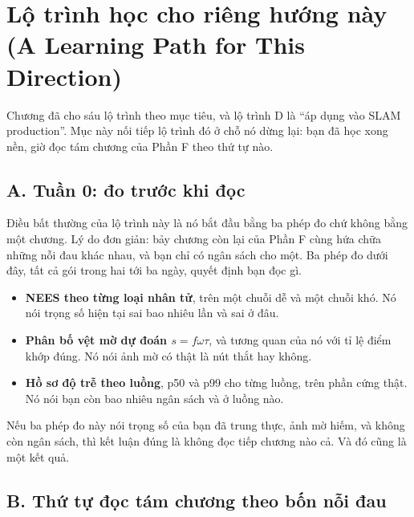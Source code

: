 \documentclass[../../deep_learning.tex]{subfiles}
\begin{document}
\section{Lộ trình học cho riêng hướng này (A Learning Path for This Direction)}

Chương  đã cho sáu lộ trình theo mục tiêu, và lộ trình D là ``áp dụng vào SLAM production''. Mục này nối tiếp lộ trình đó ở chỗ nó dừng lại: bạn đã học xong nền, giờ đọc tám chương của Phần F theo thứ tự nào.

\subsection{A. Tuần 0: đo trước khi đọc}

Điều bất thường của lộ trình này là nó bắt đầu bằng ba phép đo chứ không bằng một chương. Lý do đơn giản: bảy chương còn lại của Phần F cùng hứa chữa những nỗi đau khác nhau, và bạn chỉ có ngân sách cho một. Ba phép đo dưới đây, tất cả gói trong hai tới ba ngày, quyết định bạn đọc gì.

\begin{itemize}
\item \textbf{NEES theo từng loại nhân tử}, trên một chuỗi dễ và một chuỗi khó. Nó nói trọng số hiện tại sai bao nhiêu lần và sai ở đâu.
\item \textbf{Phân bố vệt mờ dự đoán \(s = f\omega\tau\)}, và tương quan của nó với tỉ lệ điểm khớp đúng. Nó nói ảnh mờ có thật là nút thắt hay không.
\item \textbf{Hồ sơ độ trễ theo luồng}, p50 và p99 cho từng luồng, trên phần cứng thật. Nó nói bạn còn bao nhiêu ngân sách và ở luồng nào.
\end{itemize}

Nếu ba phép đo này nói trọng số của bạn đã trung thực, ảnh mờ hiếm, và không còn ngân sách, thì kết luận đúng là không đọc tiếp chương nào cả. Và đó cũng là một kết quả.

\subsection{B. Thứ tự đọc tám chương theo bốn nỗi đau}
\end{document}
